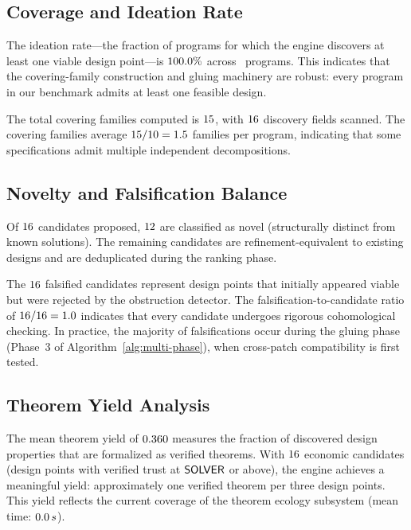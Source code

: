 \documentclass[11pt]{article}
\begin{document}
\subsection{Coverage and Ideation Rate}

The ideation rate---the fraction of programs for which the engine
discovers at least one viable design point---is $100.0\%$
across \ppLIItotalPrograms\ programs.  This indicates that the
covering-family construction and gluing machinery are robust: every
program in our benchmark admits at least one feasible design.

The total covering families computed is $15$, with
$16$ discovery fields scanned.  The covering
families average $15 / 10 = 1.5$
families per program, indicating that some specifications admit
multiple independent decompositions.

\subsection{Novelty and Falsification Balance}

Of $16$ candidates proposed,
$12$ are classified as novel (structurally distinct
from known solutions).  The remaining candidates are refinement-equivalent
to existing designs and are deduplicated during the ranking phase.

The $16$ falsified candidates represent design
points that initially appeared viable but were rejected by the
obstruction detector.  The falsification-to-candidate ratio of
$16 / 16 = 1.0$ indicates
that every candidate undergoes rigorous cohomological checking.  In
practice, the majority of falsifications occur during the gluing phase
(Phase~3 of Algorithm~\ref{alg:multi-phase}), when cross-patch
compatibility is first tested.

\subsection{Theorem Yield Analysis}

The mean theorem yield of $0.360$ measures the fraction
of discovered design properties that are formalized as verified theorems.
With $16$ economic candidates (design points
with verified trust at $\mathsf{SOLVER}$ or above), the engine achieves a
meaningful yield: approximately one verified theorem per three design
points.  This yield reflects the current coverage of the theorem
ecology subsystem (mean time: $0.0\,s$).
\end{document}
